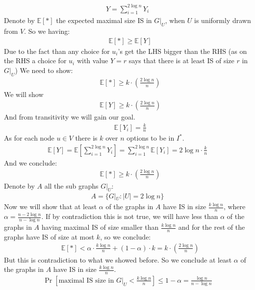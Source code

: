 \documentclass[11pt]{article}
\theoremstyle{plain}
\theoremstyle{nonumberplainnobrackets}
\begin{document}
\begin{align*}
Y = \sum_{i=1}^{2\log n} Y_i
\end{align*}
Denote by $\mathbb{E}[*]$ the expected maximal size IS in $G|_U$, when $U$ is uniformly drawn from $V$. 
So we having:
\begin{align*}
&\mathbb{E}[*] \ge \mathbb{E}[Y]
\end{align*}
Due to the fact than any choice for $u_i$'s get the LHS bigger than the RHS (as on the RHS a choice for $u_i$ with value $Y=r$ says that there is at least IS of size $r$ in $G|_U$)
We need to show:
	\begin{align*}
&\mathbb{E}[*] \ge k \cdot(\frac{2\log n}{n} ) 
\end{align*}
We will show \begin{align*}
& \mathbb{E}[Y] \ge  k \cdot(\frac{2\log n}{n} ) 
\end{align*}
And from transitivity we will gain our goal. 
\begin{align*}
&\mathbb{E}[Y_i] = \frac{k}{n}
\end{align*}
As for each node $u\in V$ there is $k$ over $n$ options to be in $I^*$.
\begin{align*}
\mathbb{E}[Y] = \mathbb{E}[ \sum_{i=1}^{2\log n} Y_i] =  \sum_{i=1}^{2\log n} \mathbb{E}[ Y_i] = 2\log n \cdot \frac{k}{n}
\end{align*}
And we conclude:
	\begin{align*}
&\mathbb{E}[*] \ge k \cdot(\frac{2\log n}{n} ) 
\end{align*}
Denote by $A$ all the sub graphs $G|_U$:
\begin{align*}
A= \{ G|_U : |U|=2\log n  \}
\end{align*}
Now we will show that at least $\alpha$ of the graphs in $A$ have IS in size $\frac{k\log n }{n}$, where $\alpha=\frac{n-2\log n}{n-\log n}$. If by contradiction this is not true, we will have less than $\alpha$ of the graphs in $A$ having maximal IS of size smaller than $\frac{k\log n }{n}$ and for the rest of the graphs have IS of size at most $k$, so we conclude:
	\begin{align*}
&\mathbb{E}[*] < \alpha \cdot \frac{k\log n}{n}  + (1-\alpha)\cdot k = k \cdot(\frac{2\log n}{n} ) 
\end{align*}
But this is contradiction to what we showed before. So we conclude at least $\alpha$ of the graphs in $A$ have IS in size $\frac{k\log n }{n}$.
\begin{align*}
\Pr[\text{maximal IS size in }G|_U < \frac{k\log n }{n}]\le 1-\alpha = \frac{\log n}{n- \log n}
\end{align*}
\end{document}
